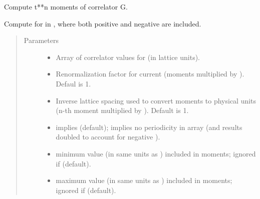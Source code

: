 \documentclass[letterpaper,10pt,english]{sphinxmanual}
\begin{document}
\begin{fulllineitems}
\label{\detokenize{g2tools:g2tools.moments}}
Compute t**n moments of correlator G.

Compute  for  in , where both positive and
negative  are included.
\begin{quote}\begin{description}
\item[{Parameters}] \leavevmode\begin{itemize}
\item {} 
 \textendash{} Array of correlator values  for  (in
lattice units).

\item {} 
 \textendash{} Renormalization factor for current (moments multiplied by ).
Defaul is 1.

\item {} 
 \textendash{} Inverse lattice spacing used to convert moments to
physical units (n-th moment multiplied by ).
Default is 1.

\item {} 
 \textendash{}  implies  (default);
 implies no periodicity in array 
(and results doubled to account for negative ).

\item {} 
 \textendash{} minimum  value (in same units as ) included in
moments; ignored if  (default).

\item {} 
 \textendash{} maximum  value (in same units as ) included in
moments; ignored if  (default).


\end{itemize}
\end{description}
\end{quote}
\end{fulllineitems}
\end{document}
